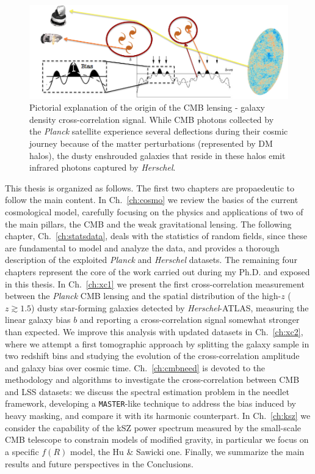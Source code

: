 \begin{figure} %
\centering %
\includegraphics[width=\textwidth]{Introduction/Images/xc}
\caption{Pictorial explanation of the origin of the CMB lensing - galaxy density cross-correlation signal. While CMB photons collected by the \textit{Planck} satellite experience several deflections during their cosmic journey because of the matter perturbations (represented by DM halos), the dusty enshrouded galaxies that reside in these halos emit infrared photons captured by \textit{Herschel}.\label{fig:xc}}
\end{figure}

This thesis is organized as follows. The first two chapters are propaedeutic to follow the main content. In Ch.~\ref{ch:cosmo} we review the basics of the current cosmological model, carefully focusing on the physics and applications of two of the main pillars, the CMB and the weak gravitational lensing. The following chapter, Ch.~\ref{ch:statsdata}, deals with the statistics of random fields, since these are fundamental to model and analyze the data, and provides a thorough description of the exploited \textit{Planck} and \textit{Herschel} datasets. The remaining four chapters represent the core of the work carried out during my Ph.D. and exposed in this thesis. In Ch.~\ref{ch:xc1} we present the first cross-correlation measurement between the \textit{Planck} CMB lensing and the spatial distribution of the high-$z$ ($z \gtrsim 1.5 $) dusty star-forming galaxies detected by \textit{Herschel}-ATLAS, measuring the linear galaxy bias $b$ and reporting a cross-correlation signal somewhat stronger than expected. We improve this analysis with updated datasets in Ch.~\ref{ch:xc2}, where we attempt a first tomographic approach by splitting the galaxy sample in two redshift bins and studying the evolution of the cross-correlation amplitude and galaxy bias over cosmic time. Ch.~\ref{ch:cmbneed} is devoted to the methodology and algorithms to investigate the cross-correlation between CMB and LSS datasets: we discuss the spectral estimation problem in the needlet framework, developing a \texttt{MASTER}-like technique to address the bias induced by heavy masking, and compare it with its harmonic counterpart. In Ch.~\ref{ch:ksz} we consider the capability of the kSZ power spectrum measured by the small-scale CMB telescope to constrain models of modified gravity, in particular we focus on a specific $f(R)$ model, the Hu \& Sawicki one. Finally, we summarize the main results and future perspectives in the Conclusions.






